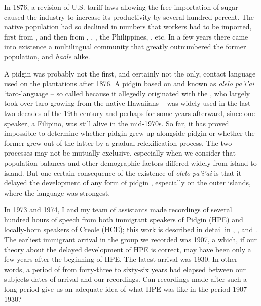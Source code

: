 In 1876, a revision of U.S. tariff laws allowing the free importa\-tion of  sugar caused the industry to increase its productivity by several hundred percent. The native  population had so declined in numbers that workers had to be imported, first from , and then from , , , the Philippines, , etc. In a few years there came into existence a multilingual community that greatly outnumbered the former population,  and \textit{haole} alike.

A pidgin  was probably not the first, and certainly not the only, contact language used on the  plantations after 1876. A pidgin based on  and known as \textit{olelo} \textit{pa'i'ai} `taro-language -- so called because it allegedly originated with the , who largely took over taro growing from the native Hawaiians -- was widely used in the last two decades of the 19th century \citep[307--308]{Bickerton1977} and perhaps for some years afterward, since one speaker, a Filipino, was still alive in the mid-1970s. So far, it has proved impos\-sible to determine whether pidgin  grew up alongside pidgin  or whether the former grew out of the latter by a gradual relexification process. The two processes may not be mutually exclu\-sive, especially when we consider that population balances and other demographic factors differed widely from island to island. But one certain consequence of the existence of \textit{olelo} \textit{pa'i'ai} is that it delayed the development of any form of pidgin , especially on the outer islands, where the  language was strongest.

In 1973 and 1974, I and my team of assistants made recordings
of several hundred hours of speech from both immigrant speakers of  Pidgin  (HPE) and locally-born speakers of  Creole  (HCE); this work is described in detail in \citet{BickertonEtAl1976a}, \citet{BickertonEtAl1976b}, and \citet{Bickerton1977}. The earliest immigrant arrival in the group we recorded was 1907, a  which, if our theory about the delayed development of HPE is correct, may have been only a few years after the beginning of HPE. The latest arrival was 1930. In other words, a period of from forty-three to sixty-six years had elapsed between our subjects dates of arrival and our recordings. Can recordings made after such a long period give us an adequate idea of what HPE was like in the period 1907--1930?


